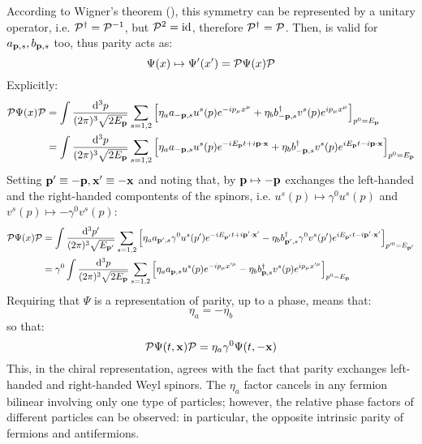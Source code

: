 According to Wigner's theorem (), this symmetry can be represented by a unitary operator, i.e. $ \mathcal{P}^\dagger = \mathcal{P}^{-1} $, but $ \mathcal{P}^2 = \operatorname{id} $, therefore $ \mathcal{P}^\dagger = \mathcal{P} $. Then,  is valid for $ a_{\mathbf{p},s} , b_{\mathbf{p},s} $ too, thus parity acts as:
\begin{equation}
  \Psi(x) \mapsto \Psi'(x') = \mathcal{P} \Psi(x) \mathcal{P}
\end{equation}
Explicitly:
\begin{equation*}
  \begin{split}
    \mathcal{P} \Psi(x) \mathcal{P}
    &= \int \frac{\mathrm{d}^3p}{(2\pi)^3 \sqrt{2E_{\mathbf{p}}}} \sum_{s = 1,2} \left[ \eta_a a_{-\mathbf{p},s} u^s(p) e^{-i p_\mu x^\mu} + \eta_b b_{-\mathbf{p},s}^\dagger v^s(p) e^{i p_\mu x^\mu} \right]_{p^0 = E_{\mathbf{p}}} \\
    &= \int \frac{\mathrm{d}^3p}{(2\pi)^3 \sqrt{2E_{\mathbf{p}}}} \sum_{s = 1,2} \left[ \eta_a a_{-\mathbf{p},s} u^s(p) e^{-i E_{\mathbf{p}} t + i \mathbf{p} \cdot \mathbf{x}} + \eta_b b_{-\mathbf{p},s}^\dagger v^s(p) e^{i E_{\mathbf{p}} t - i \mathbf{p} \cdot \mathbf{x}} \right]_{p^0 = E_{\mathbf{p}}} \\
  \end{split}
\end{equation*}
Setting $ \mathbf{p}' \equiv - \mathbf{p} , \mathbf{x}' \equiv -\mathbf{x} $ and noting that, by  $ \mathbf{p} \mapsto -\mathbf{p} $ exchanges the left-handed and the right-handed compontents of the spinors, i.e. $ u^s(p) \mapsto \gamma^0 u^s(p) $ and $ v^s(p) \mapsto - \gamma^0 v^s(p) $:
\begin{equation*}
  \begin{split}
    \mathcal{P} \Psi(x) \mathcal{P}
    &= \int \frac{\mathrm{d}^3p'}{(2\pi)^3 \sqrt{E_{\mathbf{p}'}}} \sum_{s = 1,2} \left[ \eta_a a_{\mathbf{p}',s} \gamma^0 u^s(p') e^{-i E_{\mathbf{p}'} t + i \mathbf{p}' \cdot \mathbf{x}'} - \eta_b b_{\mathbf{p}',s}^\dagger \gamma^0 v^s(p') e^{i E_{\mathbf{p}'} t - i \mathbf{p}' \cdot \mathbf{x}'} \right]_{p'^0 = E_{\mathbf{p}'}} \\
    &= \gamma^0 \int \frac{\mathrm{d}^3p}{(2\pi)^3 \sqrt{2E_{\mathbf{p}}}} \sum_{s = 1,2} \left[ \eta_a a_{\mathbf{p},s} u^s(p) e^{-i p_\mu x'^\mu} - \eta_b b_{\mathbf{p},s}^\dagger v^s(p) e^{i p_\mu x'^\mu} \right]_{p^0 = E_{\mathbf{p}}}
  \end{split}
\end{equation*}
Requiring that $ \Psi $ is a representation of parity, up to a phase, means that:
\begin{equation}
  \eta_a = - \eta_b
\end{equation}
so that:
\begin{equation}
  \mathcal{P} \Psi(t,\mathbf{x}) \mathcal{P} = \eta_a \gamma^0 \Psi(t,-\mathbf{x})
\end{equation}
This, in the chiral representation, agrees with the fact that parity exchanges left-handed and right-handed Weyl spinors. The $ \eta_a $ factor cancels in any fermion bilinear involving only one type of particles; however, the relative phase factors of different particles can be observed: in particular, the opposite intrinsic parity of fermions and antifermions.

